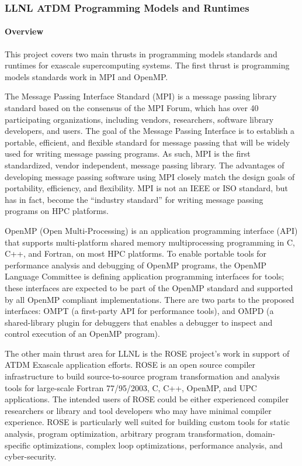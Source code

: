 \subsubsection{ LLNL ATDM Programming Models and Runtimes}


\paragraph{Overview} 
This project covers two main thrusts in programming models standards and 
runtimes for exascale supercomputing systems. The first thrust is 
programming models standards work in MPI and OpenMP. 

The Message Passing Interface Standard (MPI) is a message passing library standard based on the consensus of the MPI Forum, which has over 40 participating organizations, including vendors, researchers, software library developers, and users. The goal of the Message Passing Interface is to establish a portable, efficient, and flexible standard for message passing that will be widely used for writing message passing programs. As such, MPI is the first standardized, vendor independent, message passing library. The advantages of developing message passing software using MPI closely match the design goals of portability, efficiency, and flexibility. MPI is not an IEEE or ISO standard, but has in fact, become the ``industry standard'' for writing message passing programs on HPC platforms.

OpenMP (Open Multi-Processing) is an application programming interface (API) that supports multi-platform shared memory multiprocessing programming in C, C++, and Fortran, on most HPC platforms. To enable portable tools for performance analysis and debugging of OpenMP programs, the OpenMP Language Committee is defining application programming interfaces for tools; these interfaces are expected to be part of the OpenMP standard and supported by all OpenMP compliant implementations. There are two parts to the proposed interfaces: OMPT (a first-party API for performance tools), and OMPD (a shared-library plugin for debuggers that enables a debugger to inspect and control execution of an OpenMP program).

The other main thrust area for LLNL is the ROSE project’s work in support of 
ATDM Exascale application efforts.  
ROSE is an open source compiler infrastructure to build source-to-source program transformation and analysis tools for large-scale Fortran 77/95/2003, C, C++, OpenMP, and UPC applications. The intended users of ROSE could be either experienced compiler researchers or library and tool developers who may have minimal compiler experience. ROSE is particularly well suited for building custom tools for static analysis, program optimization, arbitrary program transformation, domain-specific optimizations, complex loop optimizations, performance analysis, and cyber-security.



